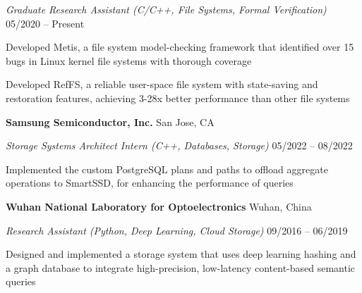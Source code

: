 \documentclass[a4paper,10pt,oneside]{article}
\begin{document}
\begin{body}
\emph{Graduate Research Assistant (C/C++, File Systems, Formal Verification)}
\hfill
05/2020 --
Present

\GapNoBreak
\BulletItem
Developed Metis, a file system model-checking framework that identified over 15 bugs in Linux kernel file systems with thorough coverage 

\GapNoBreak
\BulletItem
Developed RefFS, a reliable user-space file system with state-saving and restoration features, achieving 3-28x better performance than other file systems 


\GapNoBreak

{\textbf{Samsung Semiconductor, Inc.}}
\hfill
San Jose, CA

\emph{Storage Systems Architect Intern (C++, Databases, Storage)}
\hfill
05/2022 --
08/2022

\GapNoBreak
\BulletItem
Implemented the custom PostgreSQL plans and paths to offload aggregate operations to SmartSSD, for enhancing the performance of queries





\GapNoBreak
{\textbf{Wuhan National Laboratory for Optoelectronics}}
\hfill
Wuhan, China

\emph{Research Assistant (Python, Deep Learning, Cloud Storage)}
\hfill
09/2016 --
06/2019

\GapNoBreak
\BulletItem
Designed and implemented a storage system that uses deep learning hashing and a graph database to integrate high-precision, low-latency content-based semantic queries 


\end{body}
\end{document}
